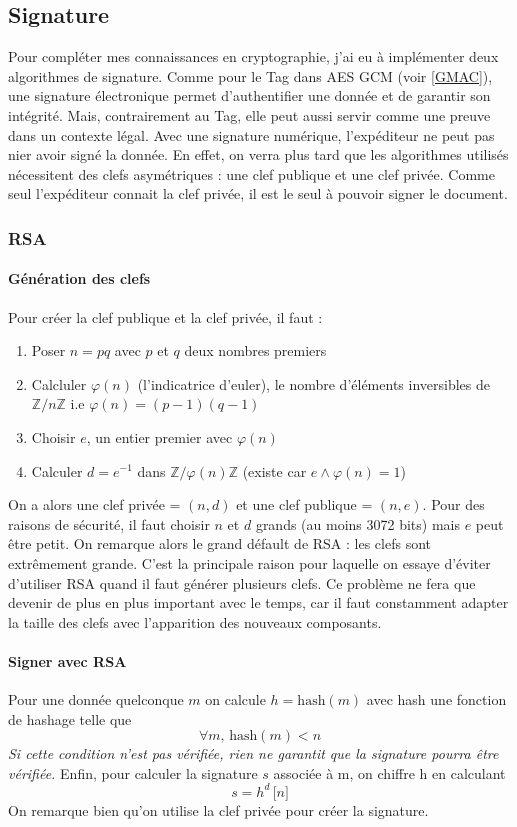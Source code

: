 \documentclass[a4paper, 12pt]{article}
\begin{document}
\subsection{Signature}
Pour compléter mes connaissances en cryptographie, j'ai eu à implémenter deux algorithmes de signature. Comme pour le Tag dans AES GCM (voir \ref{GMAC}), une signature électronique permet d'authentifier une donnée et de garantir son intégrité. Mais, contrairement au Tag, elle peut aussi servir comme une preuve dans un contexte légal. Avec une signature numérique, l'expéditeur ne peut pas nier avoir signé la donnée. En effet, on verra plus tard que les algorithmes utilisés nécessitent des clefs asymétriques : une clef publique et une clef privée. Comme seul l'expéditeur connait la clef privée, il est le seul à pouvoir signer le document.

\subsubsection{RSA}
\paragraph{Génération des clefs}\label{keygenRSA}
\noindent Pour créer la clef publique et la clef privée, il faut :
\begin{enumerate}
	\item Poser $n = pq$ avec $p$ et $q$ deux nombres premiers
	\item Calcluler $\varphi(n)$ (l'indicatrice d'euler), le nombre d'éléments inversibles de $\mathbb{Z}/n\mathbb{Z}$ i.e $\varphi\left( n\right) = (p-1)(q-1)$
	\item Choisir $e$, un entier premier avec $\varphi(n)$
	\item Calculer $d = e^{-1}$ dans $\mathbb{Z}/\varphi(n)\mathbb{Z}$ (existe car $e \wedge \varphi(n) = 1$) 
\end{enumerate}
On a alors une clef privée = $(n, d)$ et une clef publique = $(n,e)$. Pour des raisons de sécurité, il faut choisir $n$ et $d$ grands (au moins 3072 bits) mais $e$ peut être petit. On remarque alors le grand défault de RSA :  les clefs sont extrêmement grande. C'est la principale raison pour laquelle on essaye d'éviter d'utiliser RSA quand il faut générer plusieurs clefs. Ce problème ne fera que devenir de plus en plus important avec le temps, car il faut constamment adapter la taille des clefs avec l'apparition des nouveaux composants.

\paragraph{Signer avec RSA}
Pour une donnée quelconque $m$ on calcule $h = \text{hash}(m)$ avec hash une fonction de hashage telle que 
$$
\forall m, \, \text{hash}(m) < n
$$ 
\emph{Si cette condition n'est pas vérifiée, rien ne garantit que la signature pourra être vérifiée.}
Enfin, pour calculer la signature $s$ associée à m, on chiffre h en calculant 
$$
s = h^d \, \lbrack n \rbrack
$$
On remarque bien qu'on utilise la clef privée pour créer la signature.
\end{document}
